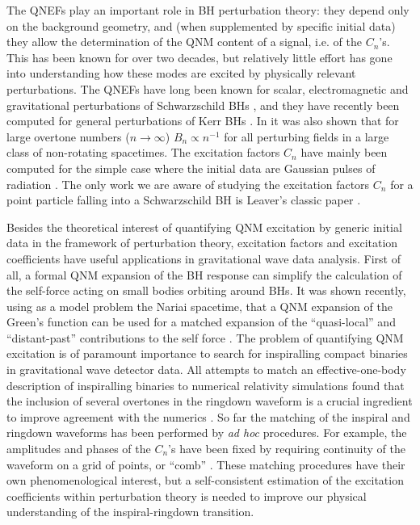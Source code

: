\documentclass[]{iopart}
\begin{document}
The QNEFs play an important role in BH perturbation theory: they depend only
on the background geometry, and (when supplemented by specific initial data)
they allow the determination of the QNM content of a signal, i.e. of the
$C_n$'s. This has been known for over two decades, but relatively little
effort has gone into understanding how these modes are excited by physically
relevant perturbations. The QNEFs have long been known for scalar,
electromagnetic and gravitational perturbations of Schwarzschild BHs
\cite{Leaver:1986gd,Sun:1988tz,Andersson:1995zk,Andersson:1996cm}, and they
have recently been computed for general perturbations of Kerr BHs
\cite{Berti:2006wq}. In \cite{Berti:2006wq} it was also shown that for large
overtone numbers ($n \rightarrow \infty$) $B_n \propto n^{-1}$ for all
perturbing fields in a large class of non-rotating spacetimes.  The excitation
factors $C_n$ have mainly been computed for the simple case where the initial
data are Gaussian pulses of radiation
\cite{Andersson:1995zk,Berti:2006wq}. The only work we are aware of studying
the excitation factors $C_n$ for a point particle falling into a Schwarzschild
BH is Leaver's classic paper \cite{Leaver:1986gd}.

Besides the theoretical interest of quantifying QNM excitation by generic
initial data in the framework of perturbation theory, excitation factors and
excitation coefficients have useful applications in gravitational wave data
analysis.
%
First of all, a formal QNM expansion of the BH response can simplify the
calculation of the self-force acting on small bodies orbiting around BHs. It
was shown recently, using as a model problem the Nariai spacetime, that a QNM
expansion of the Green's function can be used for a matched expansion of the
``quasi-local'' and ``distant-past'' contributions to the self force
\cite{Casals:2009zh}.
%
The problem of quantifying QNM excitation is of paramount importance to search
for inspiralling compact binaries in gravitational wave detector data. All
attempts to match an effective-one-body description of inspiralling binaries
to numerical relativity simulations found that the inclusion of several
overtones in the ringdown waveform is a crucial ingredient to improve
agreement with the numerics \cite{Buonanno:2009qa,Damour:2009kr}.  So far the
matching of the inspiral and ringdown waveforms has been performed by {\em ad
  hoc} procedures. For example, the amplitudes and phases of the $C_n$'s have
been fixed by requiring continuity of the waveform on a grid of points, or
``comb'' \cite{Damour:2007xr}. These matching procedures have their own
phenomenological interest, but a self-consistent estimation of the excitation
coefficients within perturbation theory is needed to improve our physical
understanding of the inspiral-ringdown transition.
\end{document}
